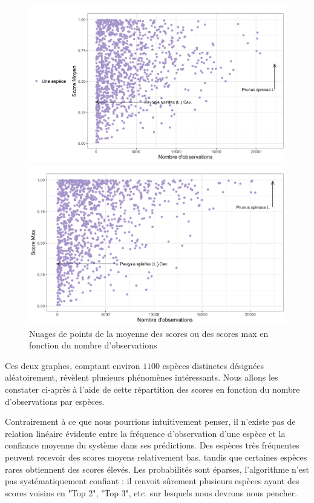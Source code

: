\documentclass[a4paper,12pt]{article}
\begin{document}
\begin{figure}[H]
\centering
\begin{minipage}{0.5\textwidth}
  \includegraphics[width=0.9\linewidth]{images/mean_rd.png}
\end{minipage}%
\begin{minipage}{0.5\textwidth}
  \includegraphics[width=0.9\linewidth]{images/max_rd.png}
\end{minipage}
\caption{Nuages de points de la moyenne des scores ou des scores max en fonction du nombre d'observations}
\end{figure}

Ces deux graphes, comptant environ $\num{1100}$ espèces distinctes désignées aléatoirement, révèlent plusieurs phénomènes intéressants. Nous allons les constater ci-après à l'aide de cette répartition des scores en fonction du nombre d'observations par espèces.

\vspace{0.2cm}

Contrairement à ce que nous pourrions intuitivement penser, il n'existe pas de relation linéaire évidente entre la fréquence d'observation d'une espèce et la confiance moyenne du système dans ses prédictions. Des espèces très fréquentes peuvent recevoir des scores moyens relativement bas, tandis que certaines espèces rares obtiennent des scores élevés. Les probabilités sont éparses, l'algorithme n'est pas systématiquement confiant : il renvoit sûrement plusieurs espèces ayant des scores voisins en "Top 2", "Top 3", etc. sur lesquels nous devrons nous pencher.
\end{document}
